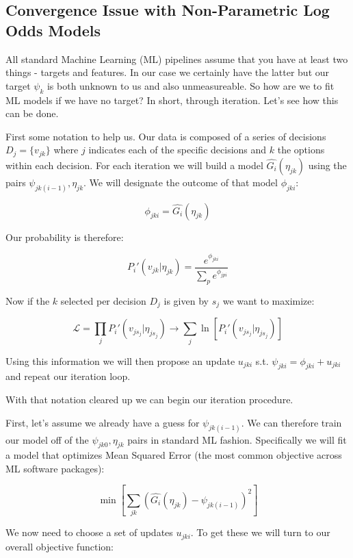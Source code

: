 \documentclass[11pt]{article}
\begin{document}
\subsection{Convergence Issue with Non-Parametric Log Odds Models} \label{convergence issues}

All standard Machine Learning (ML) pipelines assume that you have at least two things - targets and features. In our case we certainly have the latter but our target $\psi_k$ is both unknown to us and also unmeasureable. So how are we to fit ML models if we have no target? In short, through iteration. Let's see how this can be done.\newline

First some notation to help us. Our data is composed of a series of decisions $D_j=\lbrace v_{jk} \rbrace$ where $j$ indicates each of the specific decisions and $k$ the options within each decision. For each iteration we will build a model $\hat{G_i}(\eta_{jk})$ using the pairs $\psi_{jk(i-1)},\eta_{jk}$. We will designate the outcome of that model $\phi_{jki}$:

$$\phi_{jki} = \hat{G_i}(\eta_{jk})$$

Our probability is therefore:

$$P_i'(v_{jk}|\eta_{jk})=\frac{e^{\phi_{jki}}}{\sum_p e^{\phi_{jpi}}}$$

Now if the $k$ selected per decision $D_j$ is given by $s_j$ we want to maximize:

$$\mathcal{L}=\prod_j P_i'(v_{js_j} | \eta_{js_j})\rightarrow \sum_j \ln{\left[ P_i'(v_{js_j} | \eta_{js_j}) \right]}$$

Using this information we will then propose an update $u_{jki}$ s.t. $\psi_{jki}=\phi_{jki} + u_{jki}$ and repeat our iteration loop. 

With that notation cleared up we can begin our iteration procedure. \newline

First, let's assume we already have a guess for $\psi_{jk(i-1)}$. We can therefore train our model off of the $\psi_{jk0},\eta_{jk}$ pairs in standard ML fashion. Specifically we will fit a model that optimizes Mean Squared Error (the most common objective across ML software packages):

$$\min{\left[ \sum_{jk}\left(\hat{G_i}(\eta_{jk}) - \psi_{jk(i-1)}\right)^2 \right]}$$

We now need to choose a set of updates $u_{jki}$. To get these we will turn to our overall objective function:
\end{document}
